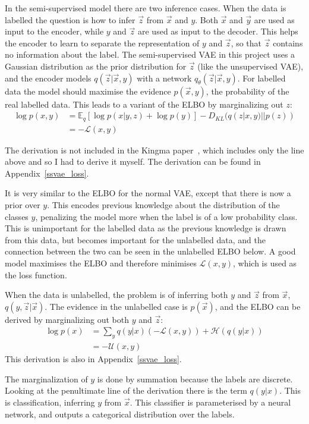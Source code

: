 In the semi-supervised model there are two inference cases. When the data is labelled the question is how to infer $\vec{z}$ from $\vec{x}$ and $y$.
Both $\vec{x}$ and $\vec{y}$ are used as input to the encoder, while $y$ and $\vec{z}$ are used as input to the decoder.
This helps the encoder to learn to separate the representation of $y$ and $\vec{z}$, so that $\vec{z}$ contains
no information about the label. The semi-supervised VAE in this project uses a Gaussian distribution as the prior distribution for 
$\vec{z}$ (like the unsupervised VAE), and the encoder models $q(\vec{z}|\vec{x}, y)$ with a network $q_{\theta}(\vec{z}|\vec{x}, y)$. For labelled data 
the model should 
maximise the evidence $p(\vec{x}, y)$, the probability of the real labelled data. This leads to a variant of the ELBO by marginalizing
out $z$:
\begin{align}
  \log p(x, y) & = \mathbb{E}_q [\log p(x|y, z) + \log p(y)] - D_{KL}(q(z|x, y)||p(z)) \\
  & = -\mathcal{L}(x, y)
\end{align}

The derivation is not included in the Kingma paper~\cite{DBLP:journals/corr/KingmaRMW14}, which includes only the line above and so I had 
to derive it myself. The derivation can be found in Appendix~\ref{ssvae_loss}.

It is very similar to the ELBO for the normal VAE, except that there is now a prior over $y$. This encodes previous knowledge about the 
distribution of the classes $y$, penalizing the model more when the label is of a low probability class. This is unimportant for the labelled
data as the previous knowledge is drawn from this data, but becomes important for the unlabelled data, and the connection between the two can be 
seen in the unlabelled ELBO below. A good model maximises the ELBO and therefore minimises $\mathcal{L}(x, y)$, which is used as the loss function.

When the data is unlabelled, the problem is of inferring both $y$ and $\vec{z}$ from $\vec{x}$, $q(y, \vec{z}|\vec{x})$. The evidence in the unlabelled 
case is $p(\vec{x})$,
and the ELBO can be derived by marginalizing out both $y$ and $\vec{z}$:
\begin{align}
  \log p(x) & = \sum_{y} q(y|x)(-\mathcal{L}(x, y)) + \mathcal{H}(q(y|x)) \\
  & = -\mathcal{U}(x, y)
\end{align}
This derivation is also in Appendix~\ref{ssvae_loss}.

The marginalization of $y$ is done by summation because the labels are discrete. Looking at the penultimate line of the derivation there is
the term $q(y|x)$. This is classification, inferring $y$ from $\vec{x}$. This classifier is parameterised
by a neural network, and outputs a categorical distribution over the labels.

